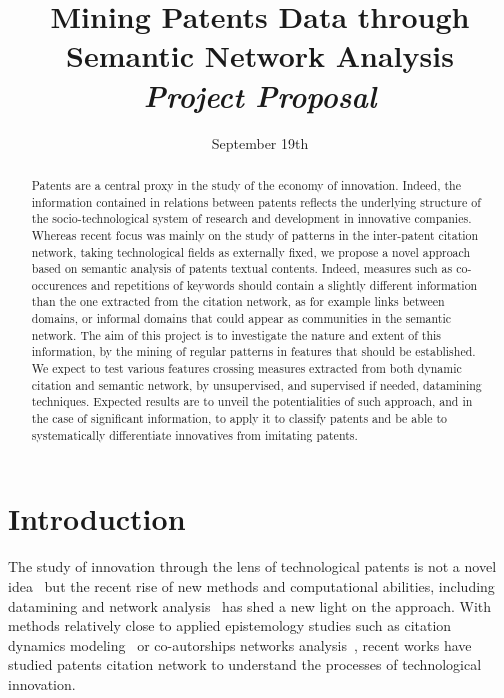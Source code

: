 


\title{Mining Patents Data through Semantic Network Analysis\bigskip\\
\textit{Project Proposal}
}
\author{}
\date{September 19th}


\maketitle

\justify


\begin{abstract}
Patents are a central proxy in the study of the economy of innovation. Indeed, the information contained in relations between patents reflects the underlying structure of the socio-technological system of research and development in innovative companies. Whereas recent focus was mainly on the study of patterns in the inter-patent citation network, taking technological fields as externally fixed, we propose a novel approach based on semantic analysis of patents textual contents. Indeed, measures such as co-occurences and repetitions of keywords should contain a slightly different information than the one extracted from the citation network, as for example links between domains, or informal domains that could appear as communities in the semantic network. The aim of this project is to investigate the nature and extent of this information, by the mining of regular patterns in features that should be established. We expect to test various features crossing measures extracted from both dynamic citation and semantic network, by unsupervised, and supervised if needed, datamining techniques. Expected results are to unveil the potentialities of such approach, and in the case of significant information, to apply it to classify patents and be able to systematically differentiate innovatives from imitating patents.
\end{abstract}


\section{Introduction}



The study of innovation through the lens of technological patents is not a novel idea~\cite{basberg1987patents} but the recent rise of new methods and computational abilities, including datamining and network analysis~\cite{newman2010networks} has shed a new light on the approach. With methods relatively close to applied epistemology studies such as citation dynamics modeling~\cite{2013arXiv1310.8220N} or co-autorships networks analysis~\cite{2014arXiv1402.7268S}, recent works have studied patents citation network to understand the processes of technological innovation.






